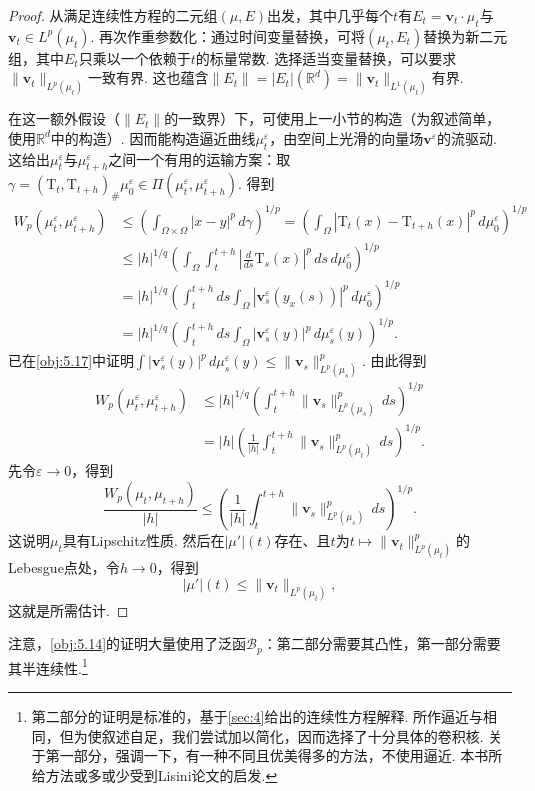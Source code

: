 \begin{proof}
从满足连续性方程的二元组$(\mu,E)$出发，其中几乎每个$t$有$E_t=\mathbf v_t\cdot\mu_t$与$\mathbf v_t\in L^p(\mu_t)$. 再次作重参数化：通过时间变量替换，可将$(\mu_t,E_t)$替换为新二元组，其中$E_t$只乘以一个依赖于$t$的标量常数. 选择适当变量替换，可以要求$\|\mathbf v_t\|_{L^p(\mu_t)}$一致有界. 这也蕴含$\|E_t\|=|E_t|(\mathbb R^d)=\|\mathbf v_t\|_{L^1(\mu_t)}$有界.

在这一额外假设（$\|E_t\|$的一致界）下，可使用上一小节的构造（为叙述简单，使用$\mathbb R^d$中的构造）. 因而能构造逼近曲线$\mu_t^\varepsilon$，由空间上光滑的向量场$\mathbf v^\varepsilon$的流驱动. 这给出$\mu_t^\varepsilon$与$\mu_{t+h}^\varepsilon$之间一个有用的运输方案：取$\gamma=(\mathrm T_t,\mathrm T_{t+h})_\#\mu_0^\varepsilon\in\Pi(\mu_t^\varepsilon,\mu_{t+h}^\varepsilon)$. 得到
\[
\begin{aligned}
W_p(\mu_t^\varepsilon,\mu_{t+h}^\varepsilon)
&\le\left(\int_{\Omega\times\Omega}|x-y|^p\,d\gamma\right)^{1/p}
=\left(\int_\Omega|\mathrm T_t(x)-\mathrm T_{t+h}(x)|^p\,d\mu_0^\varepsilon\right)^{1/p}\\
&\le|h|^{1/q}\left(\int_\Omega\int_t^{t+h}\left|\frac d{ds}\mathrm T_s(x)\right|^p\,ds\,d\mu_0^\varepsilon\right)^{1/p}\\
&=|h|^{1/q}\left(\int_t^{t+h}ds\int_\Omega|\mathbf v_s^\varepsilon(y_x(s))|^p\,d\mu_0^\varepsilon\right)^{1/p}\\
&=|h|^{1/q}\left(\int_t^{t+h}ds\int_\Omega|\mathbf v_s^\varepsilon(y)|^p\,d\mu_s^\varepsilon(y)\right)^{1/p}.
\end{aligned}
\]
已在\autoref{obj:5.17}中证明$\int|\mathbf v_s^\varepsilon(y)|^p\,d\mu_s^\varepsilon(y)\le\|\mathbf v_s\|_{L^p(\mu_s)}^p$. 由此得到
\[
\begin{aligned}
W_p(\mu_t^\varepsilon,\mu_{t+h}^\varepsilon)
&\le|h|^{1/q}\left(\int_t^{t+h}\|\mathbf v_s\|_{L^p(\mu_s)}^p\,ds\right)^{1/p}\\
&=|h|\left(\frac1{|h|}\int_t^{t+h}\|\mathbf v_s\|_{L^p(\mu_t)}^p\,ds\right)^{1/p}.
\end{aligned}
\]
先令$\varepsilon\to0$，得到
\[
\frac{W_p(\mu_t,\mu_{t+h})}{|h|}
\le\left(\frac1{|h|}\int_t^{t+h}\|\mathbf v_s\|_{L^p(\mu_s)}^p\,ds\right)^{1/p}.
\]
这说明$\mu_t$具有Lipschitz性质. 然后在$|\mu'|(t)$存在、且$t$为$t\mapsto\|\mathbf v_t\|_{L^p(\mu_t)}^p$的Lebesgue点处，令$h\to0$，得到
\[
|\mu'|(t)\le\|\mathbf v_t\|_{L^p(\mu_t)},
\]
这就是所需估计.
\end{proof}

注意，\autoref{obj:5.14}的证明大量使用了泛函$\mathscr B_p$：第二部分需要其凸性，第一部分需要其半连续性.\footnote{第二部分的证明是标准的，基于\autoref{sec:4}给出的连续性方程解释. 所作逼近与\cite{b15}相同，但为使叙述自足，我们尝试加以简化，因而选择了十分具体的卷积核. 关于第一部分，强调一下，\cite{b15}有一种不同且优美得多的方法，不使用逼近. 本书所给方法或多或少受到Lisini论文\cite{b212}的启发.}

